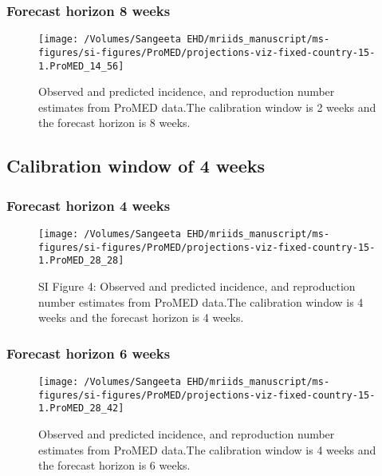 \documentclass[11pt,]{article}
\begin{document}
\hypertarget{forecast-horizon-8-weeks}{%
  \subsubsection{Forecast horizon 8 weeks}\label{forecast-horizon-8-weeks}}

\begin{figure}
  {
    \centering \texttt{[image: /Volumes/Sangeeta EHD/mriids\_manuscript/ms-figures/si-figures/ProMED/projections-viz-fixed-country-15-1.ProMED\_14\_56]} 

  }
  \caption{Observed and predicted incidence, and reproduction number
    estimates from ProMED data.The calibration window is 2 weeks and
    the forecast horizon is 8 weeks.}
  \label{fig:pm28}
\end{figure}

\hypertarget{calibration-window-of-4-weeks}{%
  \subsection{Calibration window of 4 weeks}\label{calibration-window-of-4-weeks}}

\hypertarget{forecast-horizon-4-weeks}{%
  \subsubsection{Forecast horizon 4
    weeks}\label{forecast-horizon-4-weeks}}

\begin{figure}

  {
    \centering \texttt{[image: /Volumes/Sangeeta EHD/mriids\_manuscript/ms-figures/si-figures/ProMED/projections-viz-fixed-country-15-1.ProMED\_28\_28]} 
  }
  \caption{SI Figure  4: Observed and predicted incidence, and
    reproduction number estimates from ProMED data.The calibration
    window is 4 weeks and the forecast horizon is 4 weeks.}
  \label{fig:pm44}
\end{figure}

\hypertarget{forecast-horizon-6-weeks-1}{%
  \subsubsection{Forecast horizon 6
    weeks}\label{forecast-horizon-6-weeks-1}}

\begin{figure}

  {
    \centering \texttt{[image: /Volumes/Sangeeta EHD/mriids\_manuscript/ms-figures/si-figures/ProMED/projections-viz-fixed-country-15-1.ProMED\_28\_42]} 

  }
  \caption{Observed and predicted incidence, and reproduction number
    estimates from ProMED data.The calibration window is 4 weeks and
    the forecast horizon is 6 weeks.}
  \label{fig:pm46}
\end{figure}
\end{document}
